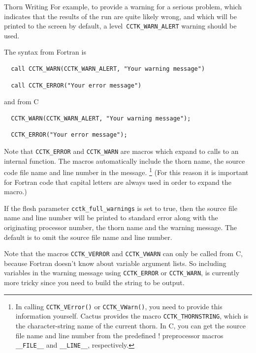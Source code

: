 \begin{cactuspart}{Thorn Writing}
For example, to provide a warning for a serious problem, which
indicates that the results of the run are quite likely wrong,
and which will be printed to the screen by default,
a level~\verb|CCTK_WARN_ALERT| warning should be used.

The syntax from Fortran is
\begin{verbatim}
  call CCTK_WARN(CCTK_WARN_ALERT, "Your warning message")
\end{verbatim}
\begin{verbatim}
  call CCTK_ERROR("Your error message")
\end{verbatim}

and from C
\begin{verbatim}
  CCTK_WARN(CCTK_WARN_ALERT, "Your warning message");
\end{verbatim}
\begin{verbatim}
  CCTK_ERROR("Your error message");
\end{verbatim}

Note that \texttt{CCTK\_ERROR} and \texttt{CCTK\_WARN} are macros
which expand to calls to an internal function. The macros
automatically include the thorn name, the source code file name and
line number in the message.%
\footnote{%
         In calling \texttt{CCTK\_VError()} or \texttt{CCTK\_VWarn()},
         you need to
         provide this information yourself.  Cactus
         provides the macro \texttt{CCTK\_THORNSTRING},
         which is the character-string name of the
         current thorn.  In C, you can get the source
         file name and line number from the predefined
!         preprocessor macros \texttt{\_\_FILE\_\_} and
         \texttt{\_\_LINE\_\_}, respectively.
         }%
{}  (For this reason it is important for Fortran code that capital
letters are always used in order to expand the macro.)

If the flesh parameter \texttt{cctk\_full\_warnings} is set to true, then the
source file name and line number will be printed to standard error along with
the originating processor number, the thorn name and the warning message.
The default is to omit the source file name and line number.

Note that the macros \texttt{CCTK\_VERROR} and
\texttt{CCTK\_VWARN} can only be called from C, because
Fortran doesn't know about variable argument lists. So including variables in
the warning message using \texttt{CCTK\_ERROR} or \texttt{CCTK\_WARN},
is currently more tricky since
you need to build the string to be output.


\end{cactuspart}
